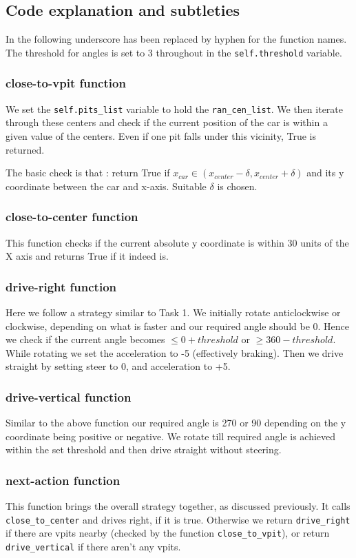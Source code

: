 \documentclass{article}
\begin{document}
{\subsection{Code explanation and subtleties}
In the following underscore has been replaced by hyphen for the function names. The threshold for angles is set to 3 throughout in the \verb!self.threshold! variable.
\subsubsection*{close-to-vpit function}
We set the \verb!self.pits_list! variable to hold the \verb!ran_cen_list!. We then iterate through these centers and check if the current
position of the car is within a given value of the centers. Even if one pit falls under this vicinity, True is returned. 

The basic check is that : 
return True if $x_{car} \in (x_{center} - \delta, x_{center} + \delta)$ and its y coordinate between the car and x-axis. Suitable $\delta$ is chosen.

\subsubsection*{close-to-center function}
This function checks if the current absolute y coordinate is within 30 units of the X axis and returns True if it indeed is.

\subsubsection*{drive-right function}
Here we follow a strategy similar to Task 1. We initially rotate anticlockwise or clockwise, depending on what is faster and our required angle
should be 0. Hence we check if the current angle becomes $\le 0 + threshold$ or $ \ge 360 - threshold $. While rotating we set the acceleration to -5 (effectively braking). Then we drive straight
by setting steer to 0, and acceleration to +5.
\subsubsection*{drive-vertical function}
Similar to the above function our required angle is 270 or 90 depending on the y coordinate being positive or negative. We rotate till required angle
is achieved within the set threshold and then drive straight without steering.

\subsubsection*{next-action function}
This function brings the overall strategy together, as discussed previously. It calls \verb!close_to_center! and 
drives right, if it is true.
Otherwise we return \verb!drive_right! if there are vpits nearby (checked by the function \verb!close_to_vpit!), or return 
\verb!drive_vertical! if there aren't any vpits.

}
\end{document}
